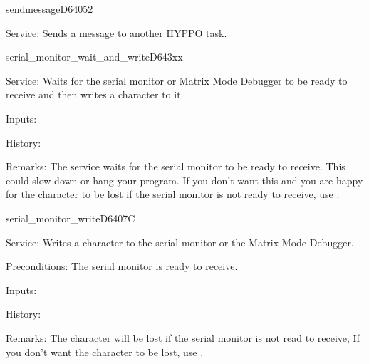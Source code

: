 \newpage
\begin{hyppotrap}{sendmessage}{D640}{52}
\item [Service:]
  Sends a message to another HYPPO task.
\notimplemented
\end{hyppotrap}


\newpage
\begin{hyppotrap}{serial\_monitor\_wait\_and\_write}{D643}{xx}
\item [Service:]
  Waits for the serial monitor or Matrix Mode Debugger to be ready to receive
  and then writes a character to it.
\item [Inputs:]
\item [History:]
\item [Remarks:]
  The service waits for the serial monitor to be ready to receive. This could
  slow down or hang your program. If you don't want this and you are happy for
  the character to be lost if the serial monitor is not ready to receive,
  use .
\end{hyppotrap}


\newpage
\begin{hyppotrap}{serial\_monitor\_write}{D640}{7C}
\item [Service:]
  Writes a character to the serial monitor or the Matrix Mode Debugger.
\item [Preconditions:]
  The serial monitor is ready to receive.
\item [Inputs:]
\item [History:]
\item [Remarks:]
  The character will be lost if the serial monitor is not read to receive,
  If you don't want the character to be lost, use
  .
\end{hyppotrap}


